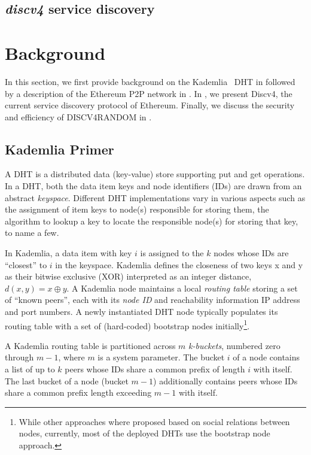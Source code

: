\subsection{\emph{discv4} service discovery}
\label{sec:background:dht}




\section{Background}
\label{sec:background}

In this section, we first provide background on the Kademlia~\cite{maymounkov2002kademlia} DHT in  followed by a description of the Ethereum P2P network in .  In , we present Discv4, the current service discovery protocol of Ethereum. Finally, we discuss the security and efficiency of DISCV4RANDOM in . 

\subsection{Kademlia Primer}
\label{sec:kademlia}

 A DHT is a distributed data (\ie key-value) store supporting put and get operations. In a DHT,
 both the data item keys and node identifiers (\ie IDs) are drawn from an abstract \textit{keyspace}. Different DHT implementations vary in various aspects such as the assignment of item keys to node(s) responsible for storing them, the algorithm to lookup a key to locate the responsible node(s) for storing that key, to name a few.

 In Kademlia, a data item with key $i$ is assigned to the $k$ nodes whose IDs are ``closest'' to $i$ in the keyspace. Kademlia defines the closeness of two keys x and y as their bitwise exclusive (XOR) interpreted as an integer distance, \ie $d(x,y) = x \oplus y$. A Kademlia node maintains a local \textit{routing table} storing a set of ``known peers'', each with its \textit{node ID} and reachability information \ie IP address and port numbers. A newly instantiated DHT node typically populates its routing table with a set of (hard-coded) bootstrap nodes initially\footnote{While other approaches where proposed based on social relations between nodes, currently, most of the deployed DHTs use the bootstrap node approach.}. 

A Kademlia routing table is partitioned across $m$ \textit{k-buckets}, numbered zero through $m-1$, where $m$ is a system parameter. The bucket $i$ of a node contains a list of up to $k$ peers whose IDs share a common prefix of length $i$ with itself. The last bucket of a node (\ie bucket $m-1$) additionally contains peers whose IDs share a common prefix length exceeding $m-1$ with itself. %



